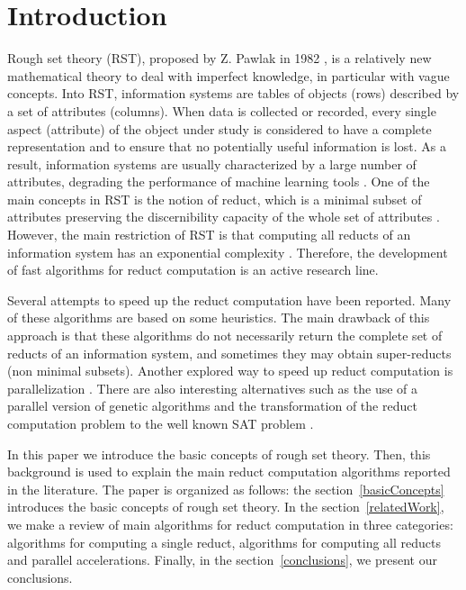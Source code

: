 \documentclass[citenumber]{llncs}
\begin{document}
\section{Introduction}
%
	Rough set theory (RST), proposed by Z. Pawlak in 1982 \cite{Pawlak81,Pawlak81-2,Pawlak82,Pawlak91}, is a relatively new mathematical theory to deal with imperfect knowledge, in particular with vague concepts. Into RST, information systems are tables of objects (rows) described by a set of attributes (columns). When data is collected or recorded, every single aspect (attribute) of the object under study is considered to have a complete representation and to ensure that no potentially useful information is lost. As a result, information systems are usually characterized by a large number of attributes,  degrading the performance of machine learning tools \cite{Parthalain08}. One of the main concepts in RST is the notion of reduct, which is a minimal subset of attributes preserving the discernibility capacity of the whole set of attributes \cite{Pawlak91}. However, the main restriction of RST is that computing all reducts of an information system has an exponential complexity \cite{Skowron92}. Therefore, the development of fast algorithms for reduct computation is an active research line.
  
	Several attempts to speed up the reduct computation have been reported. Many of these algorithms are based on some heuristics. The main drawback of this approach is that these algorithms do not necessarily return the complete set of reducts of an information system, and sometimes they may obtain super-reducts (non minimal subsets). Another explored way to speed up reduct computation is parallelization \cite{Strakowski08}. There are also interesting alternatives such as the use of a parallel version of genetic algorithms \cite{Wroblewski98} and the transformation of the reduct computation problem to the well known SAT problem \cite{Jensen14}.
	
	In this paper we introduce the basic concepts of rough set theory. Then, this background is used to explain the main reduct computation algorithms reported in the literature. The paper is organized as follows: the section~\ref{basicConcepts} introduces the basic concepts of rough set theory. In the section~\ref{relatedWork}, we make a review of main algorithms for reduct computation in three categories: algorithms for computing a single reduct, algorithms for computing all reducts and parallel accelerations. Finally, in the section~\ref{conclusions}, we present our conclusions.
\end{document}
